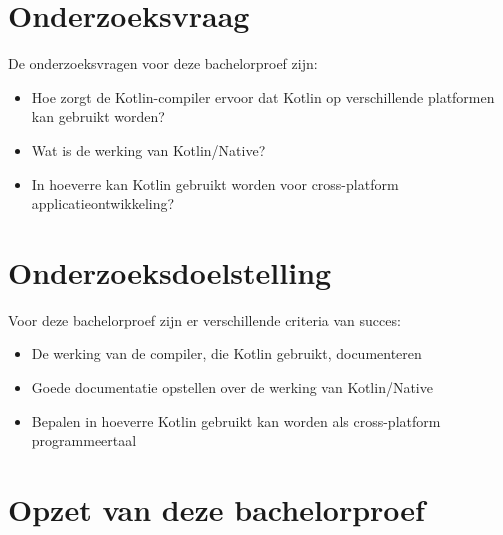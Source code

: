 \section{Onderzoeksvraag}
\label{sec:onderzoeksvraag}
De onderzoeksvragen voor deze bachelorproef zijn: 
\begin{itemize}
	\item Hoe zorgt de Kotlin-compiler ervoor dat Kotlin op verschillende platformen kan gebruikt worden?
	\item Wat is de werking van Kotlin/Native?
	\item In hoeverre kan Kotlin gebruikt worden voor cross-platform applicatieontwikkeling?
\end{itemize}

\section{Onderzoeksdoelstelling}
\label{sec:onderzoeksdoelstelling}
Voor deze bachelorproef zijn er verschillende criteria van succes:
\begin{itemize}
	\item De werking van de compiler, die Kotlin gebruikt, documenteren
	\item Goede documentatie opstellen over de werking van Kotlin/Native
	\item Bepalen in hoeverre Kotlin gebruikt kan worden als cross-platform programmeertaal
\end{itemize}

\section{Opzet van deze bachelorproef}
\label{sec:opzet-bachelorproef}

